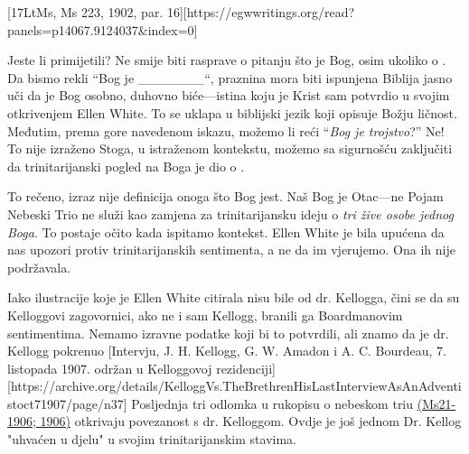 [17LtMs, Ms 223, 1902, par. 16][https://egwwritings.org/read?panels=p14067.9124037&index=0]

Jeste li primijetili? Ne smije biti rasprave o pitanju što je Bog, osim ukoliko  o . Da bismo rekli “Bog je \_\_\_\_\_\_\_“, praznina mora biti ispunjena  Biblija jasno uči da je Bog osobno, duhovno biće—istina koju je Krist sam potvrdio u svojim otkrivenjem Ellen White. To se uklapa u biblijski jezik koji opisuje Božju ličnost. Međutim, prema gore navedenom iskazu, možemo li reći “\textit{Bog je trojstvo}?” Ne! To nije izraženo  Stoga, u istraženom kontekstu, možemo sa sigurnošću zaključiti da trinitarijanski pogled na Boga je dio  o .

To rečeno, izraz  nije definicija onoga što Bog jest. Naš Bog je Otac—ne  Pojam Nebeski Trio ne služi kao zamjena za trinitarijansku ideju o \textit{tri žive osobe jednog Boga}. To postaje očito kada ispitamo kontekst. Ellen White je bila upućena da nas upozori protiv trinitarijanskih sentimenta, a ne da im vjerujemo. Ona ih nije podržavala.

Iako ilustracije koje je Ellen White citirala nisu bile od dr. Kellogga, čini se da su Kelloggovi zagovornici, ako ne i sam Kellogg, branili ga Boardmanovim sentimentima. Nemamo izravne podatke koji bi to potvrdili, ali znamo da je dr. Kellogg pokrenuo [Intervju, J. H. Kellogg, G. W. Amadon i A. C. Bourdeau, 7. listopada 1907. održan u Kelloggovoj rezidenciji][https://archive.org/details/KelloggVs.TheBrethrenHisLastInterviewAsAnAdventistoct71907/page/n37] Posljednja tri odlomka u rukopisu o nebeskom triu \href{https://egwwritings.org/?ref=en_Ms21-1906&para=9754.1}{(Ms21-1906; 1906)} otkrivaju povezanost s dr. Kelloggom. Ovdje je još jednom Dr. Kellog "uhvaćen u djelu" u svojim trinitarijanskim stavima.

